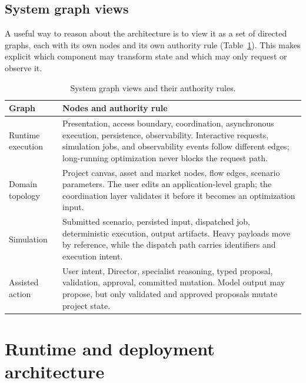 \subsection{System graph views}

A useful way to reason about the architecture is to view it as a set of directed
graphs, each with its own nodes and its own authority rule
(Table~\ref{tab:graphs}). This makes explicit which component may transform state
and which may only request or observe it.

\begin{table}[H]
  \centering
  \begin{tabularx}{\linewidth}{@{}
      >{\raggedright\arraybackslash}p{3.1cm}
      >{\raggedright\arraybackslash}X @{}}
    \toprule
    \textbf{Graph} & \textbf{Nodes and authority rule} \\
    \midrule
    Runtime execution & Presentation, access boundary, coordination, asynchronous
      execution, persistence, observability. Interactive requests, simulation
      jobs, and observability events follow different edges; long-running
      optimization never blocks the request path. \\
    \addlinespace
    Domain topology & Project canvas, asset and market nodes, flow edges, scenario
      parameters. The user edits an application-level graph; the coordination
      layer validates it before it becomes an optimization input. \\
    \addlinespace
    Simulation & Submitted scenario, persisted input, dispatched job, deterministic
      execution, output artifacts. Heavy payloads move by reference, while the
      dispatch path carries identifiers and execution intent. \\
    \addlinespace
    Assisted action & User intent, Director, specialist reasoning, typed proposal,
      validation, approval, committed mutation. Model output may propose, but only
      validated and approved proposals mutate project state. \\
    \bottomrule
  \end{tabularx}
  \caption{System graph views and their authority rules.}
  \label{tab:graphs}
\end{table}

\section{Runtime and deployment architecture}
\label{sec:runtime}

